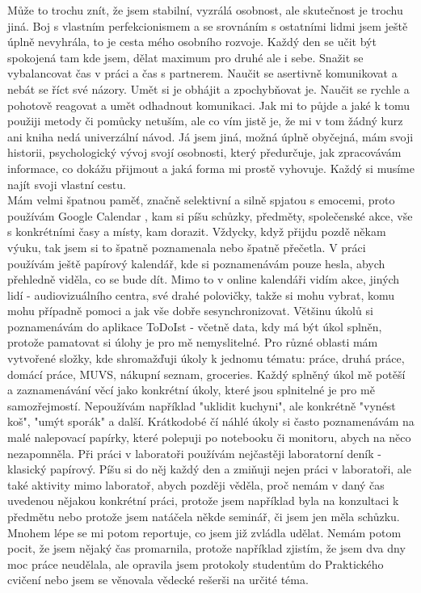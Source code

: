 \documentclass[a4paper]{scrartcl}
\begin{document}
\indent Může to trochu znít, že jsem stabilní, vyzrálá osobnost, ale skutečnost je trochu jiná. Boj s vlastním perfekcionismem a se srovnáním s ostatními lidmi 
jsem ještě úplně nevyhrála, to je cesta mého osobního rozvoje. Každý den se učit být spokojená tam kde jsem, dělat maximum pro druhé ale i sebe. Snažit se 
vybalancovat čas v práci a čas s partnerem. Naučit se asertivně komunikovat a nebát se říct své názory. Umět si je obhájit a zpochybňovat je. Naučit se rychle a 
pohotově reagovat a umět odhadnout komunikaci. Jak mi to půjde a jaké k tomu použiji metody či pomůcky netuším, ale co vím jistě je, že mi v tom žádný kurz ani 
kniha nedá univerzální návod. Já jsem jiná, možná úplně obyčejná, mám svoji historii, psychologický vývoj svojí osobnosti, který předurčuje, jak zpracovávám 
informace, co dokážu přijmout a jaká forma mi prostě vyhovuje. Každý si musíme najít svoji vlastní cestu. \\

\indent 
Mám velmi špatnou paměť, značně selektivní a silně spjatou s emocemi, proto používám Google Calendar \cite{calendar}, kam si píšu schůzky, předměty, společenské 
akce, vše s konkrétními časy a místy, kam dorazit. Vždycky, když přijdu pozdě někam výuku, tak jsem si to špatně poznamenala nebo špatně přečetla. V práci 
používám ještě papírový kalendář, kde si poznamenávám pouze hesla, abych přehledně viděla, co se bude dít. Mimo to v online kalendáři vidím akce, jiných lidí - 
audiovizuálního centra, své drahé polovičky, takže si mohu vybrat, komu mohu případně pomoci a jak vše dobře sesynchronizovat. Většinu úkolů si poznamenávám do 
aplikace ToDoIst \cite{todoist} - včetně data, kdy má být úkol splněn, protože pamatovat si úlohy je pro mě nemyslitelné. Pro různé oblasti mám vytvořené složky, 
kde shromažďuji úkoly k jednomu tématu: práce, druhá práce, domácí práce, MUVS, nákupní seznam, groceries. Každý splněný úkol mě potěší a zaznamenávání věcí jako 
konkrétní úkoly, které jsou splnitelné je pro mě samozřejmostí. Nepoužívám například "uklidit kuchyni", ale konkrétně "vynést koš", "umýt sporák" a další. 
Krátkodobé čí náhlé úkoly si často poznamenávám na malé nalepovací papírky, které polepuji po notebooku či monitoru, abych na něco nezapomněla. Při práci v 
laboratoři používám nejčastěji laboratorní deník - klasický papírový. Píšu si do něj každý den a zmiňuji nejen práci v laboratoři, ale také aktivity mimo 
laboratoř, abych později věděla, proč nemám v daný čas uvedenou nějakou konkrétní práci, protože jsem například byla na konzultaci k předmětu nebo protože jsem 
natáčela někde seminář, či jsem jen měla schůzku. Mnohem lépe se mi potom reportuje, co jsem již zvládla udělat. Nemám potom pocit, že jsem nějaký čas 
promarnila, protože například zjistím, že jsem dva dny moc práce neudělala, ale opravila jsem protokoly studentům do Praktického cvičení nebo jsem se věnovala 
vědecké rešerši na určité téma.\\
\end{document}
